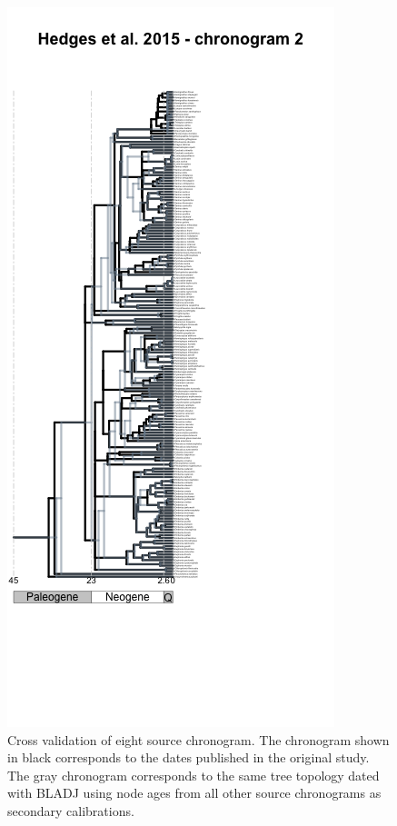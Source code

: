 \documentclass[
  english,
  man]{apa6}
\begin{document}
\begin{figure}[!h]
\includegraphics{../figures/figure-cross-validation/cross_validation_8.png}
\caption{Cross validation of eight source chronogram. The chronogram shown in black corresponds to the dates published in the original study. The gray chronogram corresponds to the same tree topology dated with BLADJ using node ages from all other source chronograms as secondary calibrations.}
\label{fig:cv8}
\end{figure}
\end{document}
